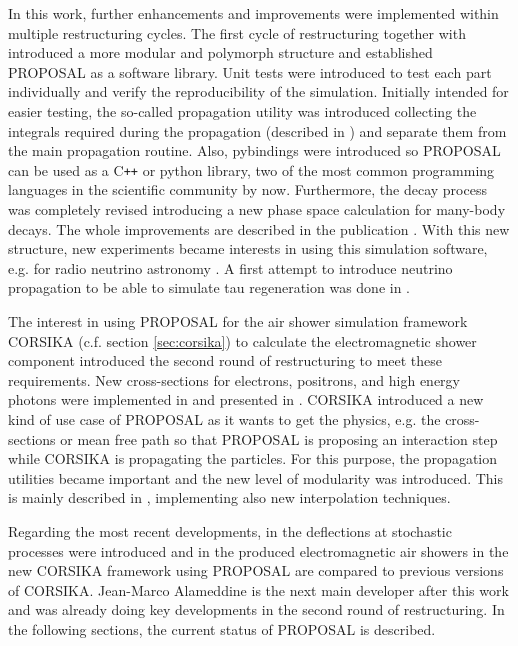 In this work, further enhancements and improvements were implemented within multiple restructuring cycles.
The first cycle of restructuring together with \cite{Dunsch18Master} introduced a more modular and polymorph structure and established PROPOSAL as a software library.
Unit tests were introduced to test each part individually and verify the reproducibility of the simulation.
Initially intended for easier testing, the so-called propagation utility was introduced collecting the integrals required during the propagation (described in ) and separate them from the main propagation routine.
Also, pybindings were introduced so PROPOSAL can be used as a C\texttt{++} or python library, two of the most common programming languages in the scientific community by now.
Furthermore, the decay process was completely revised introducing a new phase space calculation for many-body decays.
The whole improvements are described in the publication \cite{Dunsch19PROPOSAL}.
With this new structure, new experiments became interests in using this simulation software, e.g. for radio neutrino astronomy \cite{Glaser20nuRadioMC}.
A first attempt to introduce neutrino propagation to be able to simulate tau regeneration was done in \cite{Franz20Bachelor}.

The interest in using PROPOSAL for the air shower simulation framework CORSIKA (c.f. section \ref{sec:corsika}) to calculate the electromagnetic shower component introduced the second round of restructuring to meet these requirements.
New cross-sections for electrons, positrons, and high energy photons were implemented in \cite{Alameddine20Master} and presented in \cite{Alameddine20PROPOSAL}.
CORSIKA introduced a new kind of use case of PROPOSAL as it wants to get the physics, e.g. the cross-sections or mean free path so that PROPOSAL is proposing an interaction step while CORSIKA is propagating the particles.
For this purpose, the propagation utilities became important and the new level of modularity was introduced.
This is mainly described in \cite{Sackel21Master}, implementing also new interpolation techniques.

Regarding the most recent developments, in \cite{Gutjahr21Master} the deflections at stochastic processes were introduced and in \cite{Bollmann21Bachelor} the produced electromagnetic air showers in the new CORSIKA framework using PROPOSAL are compared to previous versions of CORSIKA.
Jean-Marco Alameddine is the next main developer after this work and was already doing key developments in the second round of restructuring.
In the following sections, the current status of PROPOSAL is described.

